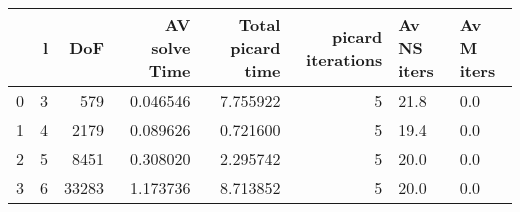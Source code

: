 \begin{tabular}{lrrrrrll}
\toprule
{} &  l &    DoF &  AV solve Time &  Total picard time &  picard iterations & Av NS iters & Av M iters \\
\midrule
0 &  3 &    579 &       0.046546 &           7.755922 &                  5 &        21.8 &        0.0 \\
1 &  4 &   2179 &       0.089626 &           0.721600 &                  5 &        19.4 &        0.0 \\
2 &  5 &   8451 &       0.308020 &           2.295742 &                  5 &        20.0 &        0.0 \\
3 &  6 &  33283 &       1.173736 &           8.713852 &                  5 &        20.0 &        0.0 \\
\bottomrule
\end{tabular}
